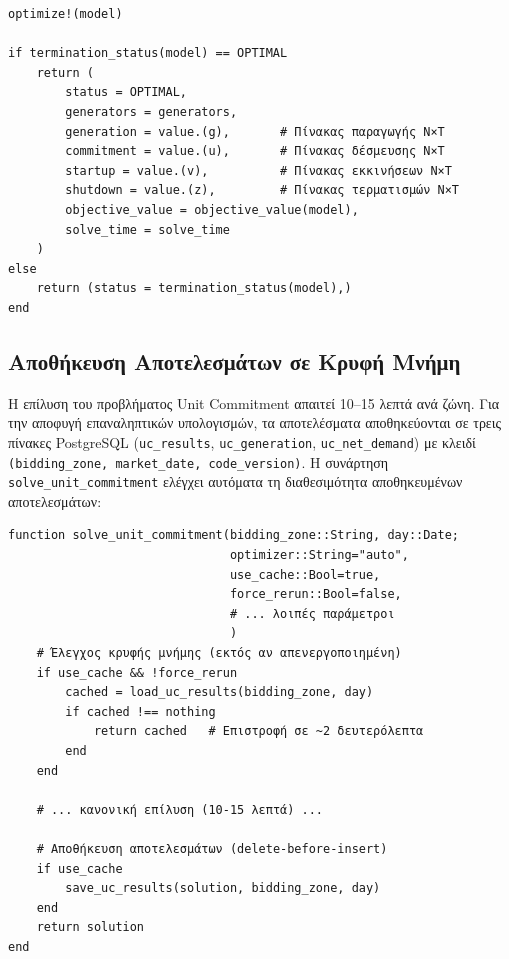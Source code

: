 \begin{samepage}
\begin{verbatim}
optimize!(model)

if termination_status(model) == OPTIMAL
    return (
        status = OPTIMAL,
        generators = generators,
        generation = value.(g),       # Πίνακας παραγωγής N×T
        commitment = value.(u),       # Πίνακας δέσμευσης N×T
        startup = value.(v),          # Πίνακας εκκινήσεων N×T
        shutdown = value.(z),         # Πίνακας τερματισμών N×T
        objective_value = objective_value(model),
        solve_time = solve_time
    )
else
    return (status = termination_status(model),)
end
\end{verbatim}
\end{samepage}

\subsection{Αποθήκευση Αποτελεσμάτων σε Κρυφή Μνήμη}
\label{subsec:uc-caching}

Η επίλυση του προβλήματος Unit Commitment απαιτεί 10--15 λεπτά ανά ζώνη. Για την αποφυγή επαναληπτικών υπολογισμών, τα αποτελέσματα αποθηκεύονται σε τρεις πίνακες PostgreSQL (\texttt{uc\_results}, \texttt{uc\_generation}, \texttt{uc\_net\_demand}) με κλειδί \texttt{(bidding\_zone, market\_date, code\_version)}. Η συνάρτηση \texttt{solve\_unit\_commitment} ελέγχει αυτόματα τη διαθεσιμότητα αποθηκευμένων αποτελεσμάτων:

\begin{samepage}
\begin{verbatim}
function solve_unit_commitment(bidding_zone::String, day::Date;
                               optimizer::String="auto",
                               use_cache::Bool=true,
                               force_rerun::Bool=false,
                               # ... λοιπές παράμετροι
                               )
    # Έλεγχος κρυφής μνήμης (εκτός αν απενεργοποιημένη)
    if use_cache && !force_rerun
        cached = load_uc_results(bidding_zone, day)
        if cached !== nothing
            return cached   # Επιστροφή σε ~2 δευτερόλεπτα
        end
    end

    # ... κανονική επίλυση (10-15 λεπτά) ...

    # Αποθήκευση αποτελεσμάτων (delete-before-insert)
    if use_cache
        save_uc_results(solution, bidding_zone, day)
    end
    return solution
end
\end{verbatim}
\end{samepage}

